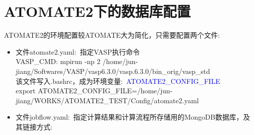 \documentclass[10pt,a4paper]{article}
\begin{document}
\section{\rm{ATOMATE2}下的数据库配置}
\textrm{ATOMATE2}的环境配置较\textrm{ATOMATE}大为简化，只需要配置两个文件:\\
\begin{itemize}
	\item 文件\textrm{atomate2.yaml}:~指定\textrm{VASP}执行命令\\
		\textrm{VASP\_CMD: mpirun -np 2 /home/jun-jiang/Softwares/VASP/vasp6.3.0/vasp.6.3.0/bin_orig/vasp\_std}\\
		该文件写入\textrm{.bashrc}，成为环境变量:~\textcolor{blue}{ATOMATE2\_CONFIG\_FILE}\\
		\textrm{export ATOMATE2\_CONFIG\_FILE=/home/jun-jiang/WORKS/ATOMATE2_TEST/Config/atomate2.yaml}

	\item 文件\textrm{jobflow.yaml}:~指定计算结果和计算流程所存储用的\textrm{MongoDB}数据库，及其链接方式:\\


\end{itemize}
\end{document}
